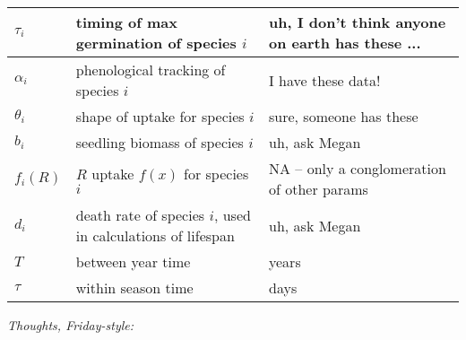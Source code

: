 \documentclass[11pt,a4paper,oneside]{article}
\begin{document}
\begin{center}
\begin{table}[h!]
\begin{tabular}{ | p{3.0cm} | p{6.0cm} | p{4.0cm} |}
\(\tau_{i}\) & timing of max germination of species \(i\) & uh, I don't think anyone on earth has these ...\\ \hline
\(\alpha_{i}\) & phenological tracking of species \(i\) & I have these data! \\ \hline
\(\theta_{i}\) & shape of uptake for species \(i\) & sure, someone has these\\ \hline
\hline
\(b_{i}\) & seedling biomass of species \(i\) & uh, ask Megan \\ \hline
\(f_{i}(R)\) & \(R\) uptake \(f(x)\) for species \(i\) & NA -- only a conglomeration of other params\\ \hline
\(d_{i}\) & death rate of species \(i\), used in calculations of lifespan & uh, ask Megan \\ \hline
\(T\) & between year time & years \\ \hline
\(\tau\) & within season time & days \\ \hline
\hline
\end{tabular}
\end{table}
\end{center}

\newpage
\noindent \emph{Thoughts, Friday-style:}\\
\end{document}
